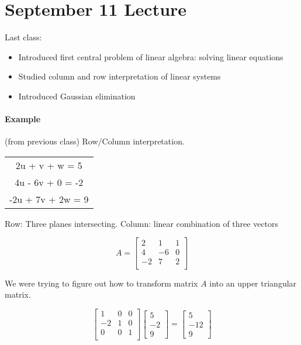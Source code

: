 \section{September 11 Lecture}

Last class:
\begin{itemize}
	\item Introduced first central problem of linear algebra: solving linear equations
	\item Studied column and row interpretation of linear systems
	\item Introduced Gaussian elimination
\end{itemize}

\paragraph{Example} (from previous class) Row/Column interpretation.

\begin{tabular}{c}
	2u + v + w = 5 \\
	4u - 6v + 0 = -2 \\
	-2u + 7v + 2w = 9
\end{tabular}

Row: Three planes intersecting. Column: linear combination of three vectors

\[
	A = \begin{bmatrix}
		2 & 1 & 1 \\
		4 & -6 & 0 \\
		-2 & 7 & 2 \\
	\end{bmatrix}
\]

We were trying to figure out how to transform matrix $A$ into an upper triangular matrix.

\[
	\begin{bmatrix}
		1 & 0 & 0 \\
		-2 & 1 & 0 \\
		0 & 0 & 1 \\
	\end{bmatrix}
	\begin{bmatrix}
		5 \\ -2 \\ 9
	\end{bmatrix}
	=
	\begin{bmatrix}
		5 \\ -12 \\ 9
	\end{bmatrix}
\]

